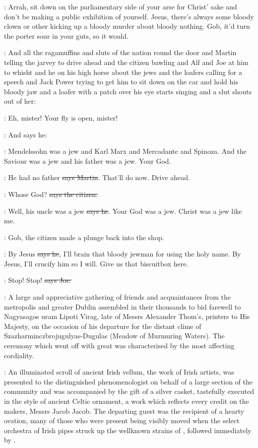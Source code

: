 \Nq:
Arrah, sit down on the parliamentary side of your arse for Christ'
sake and don't be making a public exhibition of yourself. Jesus, there's
always some bloody clown or other kicking up a bloody murder about
bloody nothing. Gob, it'd turn the porter sour in your guts, so it would.

\Nq:
And all the ragamuffins and sluts of the nation round the door and Martin
telling the jarvey to drive ahead and the citizen bawling and Alf and
Joe at him to whisht and he on his high horse about the jews and the
loafers calling for a speech and Jack Power trying to get him to sit down
on the car and hold his bloody jaw and a loafer with a patch over his eye
starts singing  and a slut
shouts out of her:

\ragamuffin:
Eh, mister! Your fly is open, mister!

\Nq:
And says he:

\Bloom:
Mendelssohn was a jew and Karl Marx and Mercadante and Spinoza.
And the Saviour was a jew and his father was a jew. Your God.

\cunningham:
He had no father \sout{says Martin}.
That'll do now. Drive ahead.

\citizen:
Whose God? \sout{says the citizen.}

\Bloom:
Well, his uncle was a jew \sout{says he}.
Your God was a jew. Christ was a jew
like me.

\Nq:
Gob, the citizen made a plunge back into the shop.

\citizen:
By Jesus \sout{says he},
I'll brain that bloody jewman for using the holy
name. By Jesus, I'll crucify him so I will.
Give us that biscuitbox here.

\joe:
Stop! Stop! \sout{says Joe.}

:
A large and appreciative gathering of friends and acquaintances from
the metropolis and greater Dublin assembled in their thousands to bid
farewell to Nagyasagos uram Lipoti Virag, late of Messrs Alexander
Thom's, printers to His Majesty, on the occasion of his departure for the
distant clime of Szazharminczbrojugulyas-Dugulas (Meadow of
Murmuring Waters). The ceremony which went off with great  was
characterised by the most affecting cordiality.

:
An illuminated scroll of
ancient Irish vellum, the work of Irish artists, was presented to the
distinguished phenomenologist on behalf of a large section of the
community and was accompanied by the gift of a silver casket, tastefully
executed in the style of ancient Celtic ornament, a work which reflects
every credit on the makers, Messrs Jacob  Jacob. The departing guest
was the recipient of a hearty ovation, many of those who were present
being visibly moved when the select orchestra of Irish pipes struck up the
wellknown strains of ,
followed immediately by .

